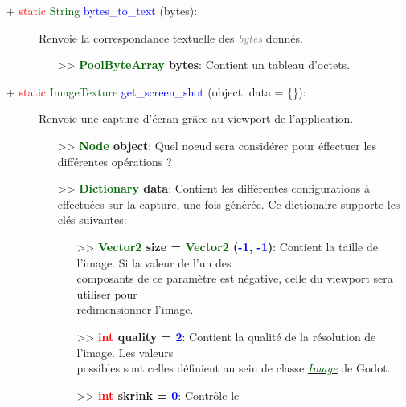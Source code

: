 \documentclass[a4paper, 11pt]{article}
\begin{document}
	\begin{description}
		\item [+ \textcolor{red}{static} \textcolor{darkgreen}{String} \textcolor{blue}{bytes\_to\_text} 
		(bytes):] Renvoie la correspondance textuelle des \textit{\textcolor{gray}{bytes}} donnés.
		\begin{itemize}
			\item [>> \textbf{\textcolor{darkgreen}{PoolByteArray} bytes}:] Contient un tableau d'octets.\\
		\end{itemize}
	\end{description}
	\begin{description}
		\item [+ \textcolor{red}{static} \textcolor{darkgreen}{ImageTexture} \textcolor{blue}
		{get\_screen\_shot} (object, data = \{\}):] Renvoie une capture d'écran grâce au viewport de
		l'application.
		\begin{itemize}
			\item [>> \textbf{\textcolor{darkgreen}{Node} object}:] Quel noeud sera considérer pour 
			éffectuer les différentes opérations ?
			\item [>> \textbf{\textcolor{darkgreen}{Dictionary} data}:] Contient les différentes
			configurations à effectuées sur la capture, une fois générée. Ce dictionaire supporte les clés
			suivantes:
			\begin{itemize}
				\item[>> \textbf{\textcolor{darkgreen}{Vector2} size = \textcolor{darkgreen}{Vector2} 
				(\textcolor{blue}{-1}, \textcolor{blue}{-1})}:] Contient la taille de l'image. Si la valeur
				de l'un des \\composants de ce paramètre est négative, celle du viewport sera utiliser pour
				\\redimensionner l'image.\\
				\item[>> \textbf{\textcolor{red}{int} quality = \textcolor{blue}{2}}:] Contient la qualité
				de la résolution de l'image. Les valeurs \\possibles sont celles définient au sein de classe 
				\href{https://docs.godotengine.org/en/stable/classes/class_image.html#class-image-constant-interpolate-bilinear}{\textit{\textcolor{darkgreen}{Image}}} de Godot.
				\\\item[>> \textbf{\textcolor{red}{int} skrink = \textcolor{blue}{0}}:] Contrôle le

\end{itemize}
\end{itemize}
\end{description}
\end{document}
